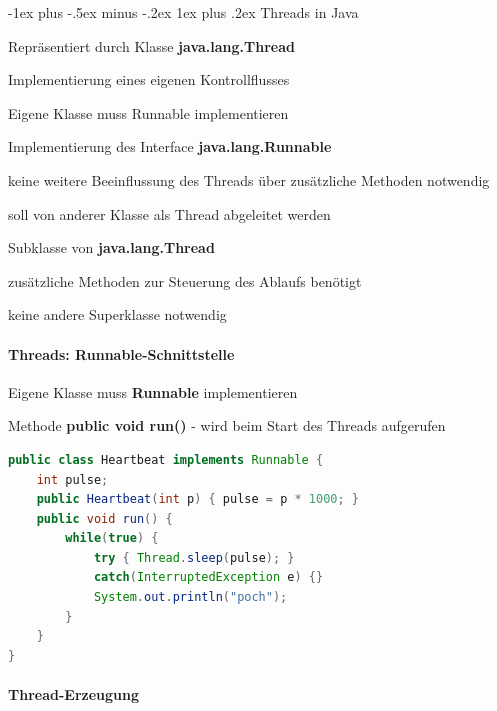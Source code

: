 \documentclass[10pt]{article}
\makeatletter
\renewcommand{\subsubsection}{\@startsection{subsubsection}{3}{0mm}%
                                {-1ex plus -.5ex minus -.2ex}%
                                {1ex plus .2ex}%
                                {\normalfont\small\bfseries}}
\makeatother
\begin{document}
\subsubsection{Threads in Java}
\begin{itemize*}
  \item Repräsentiert durch Klasse \textbf{java.lang.Thread}
  \item Implementierung eines eigenen Kontrollflusses
  \item Eigene Klasse muss Runnable implementieren
  \begin{itemize*}
    \item Implementierung des Interface \textbf{java.lang.Runnable}
    \begin{itemize*}
      \item keine weitere Beeinflussung des Threads über zusätzliche Methoden notwendig
      \item soll von anderer Klasse als Thread abgeleitet werden
    \end{itemize*}
    \item Subklasse von \textbf{java.lang.Thread}
    \begin{itemize*}
      \item zusätzliche Methoden zur Steuerung des Ablaufs benötigt
      \item keine andere Superklasse notwendig
    \end{itemize*}
  \end{itemize*}
\end{itemize*}

\paragraph{Threads: Runnable-Schnittstelle}
Eigene Klasse muss \textbf{Runnable} implementieren
\begin{itemize*}
  \item Methode \textbf{public void run()} - wird beim Start des Threads aufgerufen
\end{itemize*}
\begin{lstlisting}[language=java]
public class Heartbeat implements Runnable {
    int pulse;
    public Heartbeat(int p) { pulse = p * 1000; }
    public void run() {
        while(true) {
            try { Thread.sleep(pulse); }
            catch(InterruptedException e) {}
            System.out.println("poch");
        }
    }
}
\end{lstlisting}

\paragraph{Thread-Erzeugung}
\end{document}
